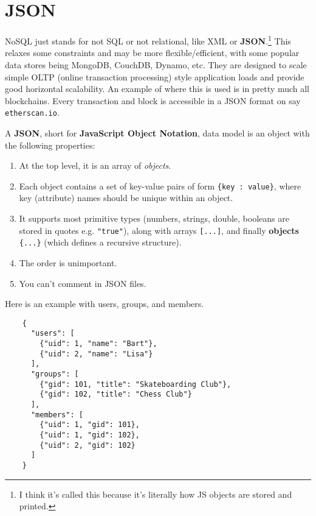 \section{JSON}

NoSQL just stands for not SQL or not relational, like XML or \textbf{JSON}.\footnote{I think it's called this because it's literally how JS objects are stored and printed.} This relaxes some constraints and may be more flexible/efficient, with some popular data stores being MongoDB, CouchDB, Dynamo, etc. They are designed to scale simple OLTP (online transaction processing) style application loads and provide good horizontal scalability. An example of where this is used is in pretty much all blockchains. Every transaction and block is accessible in a JSON format on say \texttt{etherscan.io}. 

\begin{definition}[JSON]
  A \textbf{JSON}, short for \textbf{JavaScript Object Notation}, data model is an object with the following properties: 
  \begin{enumerate} 
    \item At the top level, it is an array of \textit{objects}. 
    \item Each object contains a set of key-value pairs of form \texttt{\{key : value\}}, where key (attribute) names should be unique within an object. 
    \item It supports most primitive types (numbers, strings, double, booleans are stored in quotes e.g. \texttt{"true"}), along with arrays \texttt{[...]}, and finally \textbf{objects} \texttt{\{...\}} (which defines a recursive structure). 
    \item The order is unimportant. 
    \item You can't comment in JSON files. 
  \end{enumerate}
\end{definition}

\begin{example}
  Here is an example with users, groups, and members. 
  \begin{lstlisting}
    {
      "users": [
        {"uid": 1, "name": "Bart"},
        {"uid": 2, "name": "Lisa"}
      ],
      "groups": [
        {"gid": 101, "title": "Skateboarding Club"},
        {"gid": 102, "title": "Chess Club"}
      ],
      "members": [
        {"uid": 1, "gid": 101},
        {"uid": 1, "gid": 102},
        {"uid": 2, "gid": 102}
      ]
    } 
  \end{lstlisting}
\end{example}

